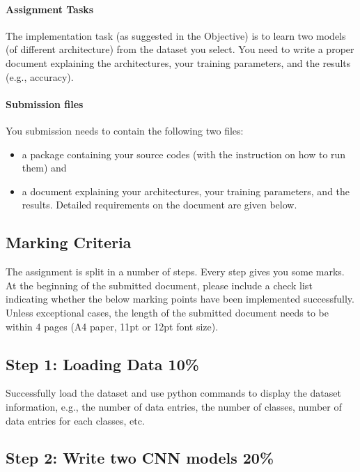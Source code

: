 \documentclass[12pt,a4]{article}
\begin{document}
\paragraph{Assignment Tasks} 

The implementation task (as suggested in the Objective) is to learn two models (of different architecture) from the dataset you select. You need to write a proper document explaining the architectures, your training parameters, and the results (e.g., accuracy). 

\paragraph{Submission files} You submission needs to contain the following two files: 
\begin{itemize}

\item a package containing your source codes (with the instruction on how to run them) and 
\item a document explaining your architectures, your training parameters, and the results. Detailed requirements on the document are given below. 

\end{itemize}

\subsection{Marking Criteria}\label{sec:marking}
The assignment is split in a number of steps. Every step gives you some marks.
At the beginning of the submitted document, please include a check list indicating whether the below marking points have been implemented successfully. Unless exceptional cases, the length of the submitted document needs to be within 4 pages (A4 paper, 11pt or 12pt font size). 

\subsection*{Step 1: Loading Data 10\%}

Successfully load the dataset and use python commands to display the dataset information, e.g., the number of data entries, the number of classes, number of data entries for each classes, etc. 

\subsection*{Step 2: Write two CNN models 20\%}
\end{document}
